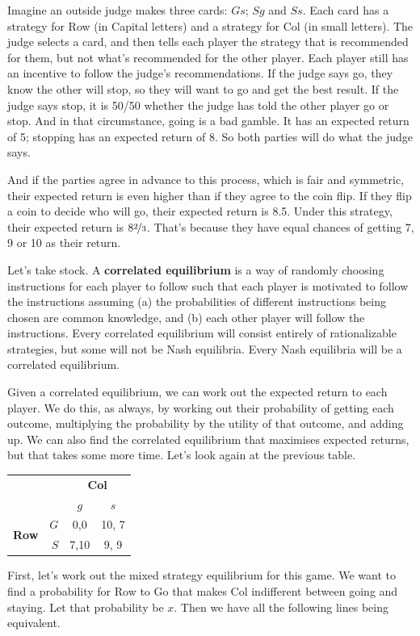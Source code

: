 \documentclass[openany]{book}
\begin{document}
Imagine an outside judge makes three cards: $Gs$; $Sg$ and $Ss$. Each card has a strategy for Row (in Capital letters) and a strategy for Col (in small letters). The judge selects a card, and then tells each player the strategy that is recommended for them, but not what's recommended for the other player. Each player still has an incentive to follow the judge's recommendations. If the judge says go, they know the other will stop, so they will want to go and get the best result. If the judge says stop, it is 50/50 whether the judge has told the other player go or stop. And in that circumstance, going is a bad gamble. It has an expected return of 5; stopping has an expected return of 8. So both parties will do what the judge says.

And if the parties agree in advance to this process, which is fair and symmetric, their expected return is even higher than if they agree to the coin flip. If they flip a coin to decide who will go, their expected return is 8.5. Under this strategy, their expected return is $8\nicefrac{2}{3}$. That's because they have equal chances of getting 7, 9 or 10 as their return.

Let's take stock. A \textbf{correlated equilibrium} is a way of randomly choosing instructions for each player to follow such that each player is motivated to follow the instructions assuming (a) the probabilities of different instructions being chosen are common knowledge, and (b) each other player will follow the instructions. Every correlated equilibrium will consist entirely of rationalizable strategies, but some will not be Nash equilibria. Every Nash equilibria will be a correlated equilibrium.

Given a correlated equilibrium, we can work out the expected return to each player. We do this, as always, by working out their probability of getting each outcome, multiplying the probability by the utility of that outcome, and adding up. We can also find the correlated equilibrium that maximises expected returns, but that takes some more time. Let's look again at the previous table.

 \begin{center}
\begin{tabular}{l r | c c}
& & \multicolumn{2}{c}{\textbf{Col}} \\
& & $g$ & $s$  \\ \hline
\multirow{2}{*}{\textbf{Row}}
& $G$ & 0,0 & 10, 7 \\
& $S$ & 7,10 & 9, 9
\end{tabular}
\end{center}
First, let's work out the mixed strategy equilibrium for this game. We want to find a probability for Row to Go that makes Col indifferent between going and staying. Let that probability be $x$. Then we have all the following lines being equivalent.
\end{document}
